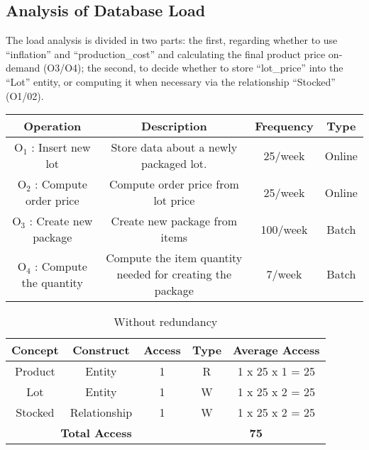 \subsection{Analysis of Database Load}
The load analysis is divided in two parts: the first, regarding whether to use ``inflation'' and ``production\_cost'' and calculating the final product price on-demand (O3/O4); the second, to decide whether to store ``lot\_price'' into the ``Lot'' entity, or computing it when necessary via the relationship ``Stocked'' (O1/02).

\begin{center}
	\begin{tabular}[!h]{ | c | c | c | c | }
		\hline
		\textbf{Operation} & \textbf{Description} & \textbf{Frequency} & \textbf{Type} \\ \hline
		$ \textrm{O}_\textrm{1} $ : Insert new lot & Store data about a newly packaged lot. & 25/week & Online \\ \hline
		$ \textrm{O}_\textrm{2} $ : Compute order price  & Compute order price from lot price & 25/week & Online \\\hline
		$ \textrm{O}_\textrm{3} $ : Create new package & Create new package from items & 100/week & Batch \\\hline
		$ \textrm{O}_\textrm{4} $ : Compute the quantity & Compute the item quantity needed for creating the package & 7/week & Batch \\\hline
	\end{tabular}
\end{center}

\begin{table}[!h]\caption{Without redundancy}
	\begin{center}
		\begin{tabular}{| c | c | c | c | c |}
			\hline
			\textbf{Concept} & \textbf{Construct} & \textbf{Access} & \textbf{Type} & \textbf{Average Access} \\ \hline
			Product & Entity & 1 & R & 1 x 25 x 1 = 25 \\ \hline
			Lot & Entity & 1 & W & 1 x 25 x 2 = 25 \\ \hline
			Stocked & Relationship & 1 & W & 1 x 25 x 2 = 25 \\ \hline
			\multicolumn{3}{|c|}{\textbf{Total Access}} & \multicolumn{2}{|c|}{\textbf{75}} \\ \hline
		\end{tabular}
	\end{center}
\end{table}

